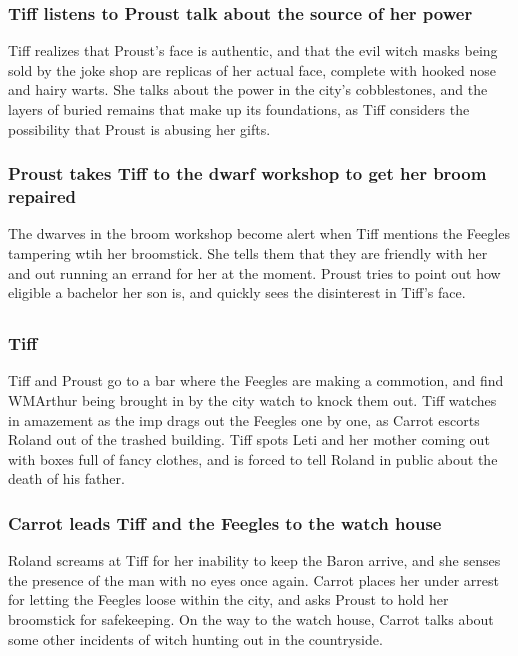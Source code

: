 \subsubsection{\Gls{Tiff} listens to \Gls{Proust} talk about the source of her power}
\Gls{Tiff} realizes that \Gls{Proust}'s face is authentic, and that the evil witch masks being sold
by the joke shop are replicas of her actual face, complete with hooked nose and hairy warts. She
talks about the power in the city's cobblestones, and the layers of buried remains that make up its
foundations, as \Gls{Tiff} considers the possibility that \Gls{Proust} is abusing her gifts.

\subsubsection{\Gls{Proust} takes \Gls{Tiff} to the dwarf workshop to get her broom repaired}
The dwarves in the broom workshop become alert when \Gls{Tiff} mentions the Feegles tampering wtih
her broomstick. She tells them that they are friendly with her and out running an errand for her
at the moment. \Gls{Proust} tries to point out how eligible a bachelor her son is, and quickly sees
the disinterest in \Gls{Tiff}'s face.

\subsection{}
\subsubsection{\Gls{Tiff} }
\Gls{Tiff} and \Gls{Proust} go to a bar where the Feegles are making a commotion, and find
\Gls{WMArthur} being brought in by the city watch to knock them out. \Gls{Tiff} watches in amazement
as the imp drags out the Feegles one by one, as \Gls{Carrot} escorts \Gls{Roland} out of the
trashed building. \Gls{Tiff} spots \Gls{Leti} and her mother coming out with boxes full of fancy
clothes, and is forced to tell \Gls{Roland} in public about the death of his father.

\subsubsection{\Gls{Carrot} leads \Gls{Tiff} and the Feegles to the watch house}
\Gls{Roland} screams at \Gls{Tiff} for her inability to keep the \Gls{Baron} arrive, and she senses
the presence of the man with no eyes once again. \Gls{Carrot} places her under arrest for letting
the Feegles loose within the city, and asks \Gls{Proust} to hold her broomstick for safekeeping. On
the way to the watch house, \Gls{Carrot} talks about some other incidents of witch hunting out in
the countryside.

